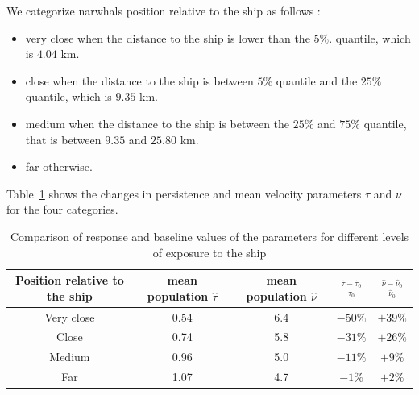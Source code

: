\documentclass[11pt]{article}
\newcommand {\1}{\mathbb{1}}
\theoremstyle{definition}
\theoremstyle{remark}
\theoremstyle{remark}
\begin{document}
We categorize narwhals position relative to the ship as follows :
\begin{itemize}
	\item very close when the distance to the ship is lower than the $5\%$. quantile, which is $4.04$ km.
	\item close when the distance to the ship is between $5\%$ quantile and the $25\%$ quantile, which is $9.35$ km.
	\item medium when the distance to the ship is between the $25\%$ and $75\%$ quantile, that is between $9.35$ and $25.80$ km.
	\item far otherwise.
\end{itemize}
Table~\ref{table: baseline vs response parameters comparison} shows the changes in persistence and mean velocity parameters $\tau$ and $\nu$ for the four categories.
\begin{table}[H]
	\centering
	\begin{tabular}{|c|c|c|c|c|}
		\hline
		Position relative to the ship & mean population $\hat{\tau}$  & mean population $\hat{\nu}$ & $\frac{\hat{\tau}-\hat{\tau}_{0}}{\tau_{0}}$ & $\frac{\hat{\nu}-\hat{\nu}_{0}}{\hat{\nu}_{0}}$   \\
		\hline
		Very close & 0.54 & 6.4 & $-50\%$ & $+39\%$ \\
		\hline
		Close & 0.74 & 5.8 & $-31\%$ & $+26\%$ \\
		\hline
		Medium&  0.96 &  5.0 & $-11\%$ & $+9\%$\\
		\hline
		Far &  1.07 & 4.7 &  $-1\%$ & $+2\%$\\
		\hline
	\end{tabular}
	\caption{Comparison of response and baseline values of the parameters for different levels of exposure to the ship}
	\label{table: baseline vs response parameters comparison}
\end{table}
\end{document}

